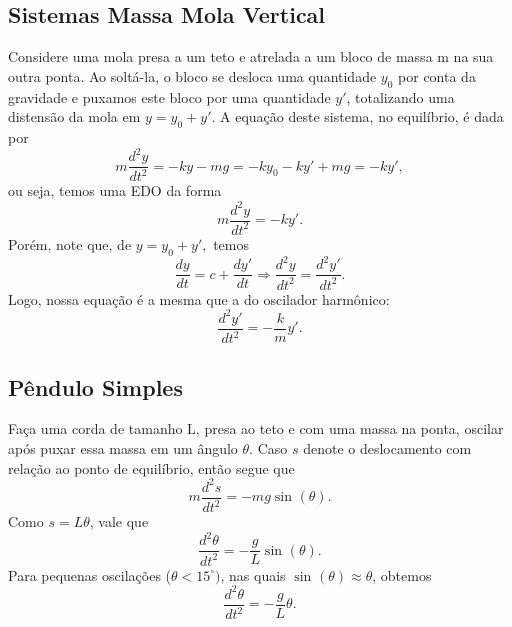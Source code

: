 \documentclass[PhysicsII/physicsII_notes.tex]{subfiles}
\begin{document}
\subsection{Sistemas Massa Mola Vertical}

Considere uma mola presa a um teto e atrelada a um bloco de massa m na sua outra ponta. Ao soltá-la, o bloco
se desloca uma quantidade \(y_{0}\) por conta da gravidade e puxamos este bloco por uma quantidade \(y'\), totalizando
uma distensão da mola em \(y = y_{0}+y'.\) A equação deste sistema, no equilíbrio, é dada por
\[
	m \frac{d^{2}y}{dt^{2}} = -ky - mg = -ky_{0}-ky'+mg = - ky',
\]
ou seja, temos uma EDO da forma
\[
	m \frac{d^{2}y}{dt^{2}} = -ky'.
\]
Porém, note que, de \(y=y_{0} + y',\) temos
\[
	\frac{dy}{dt} = c + \frac{dy'}{dt} \Rightarrow \frac{d^{2}y}{dt^{2}} = \frac{d^{2}y'}{dt^{2}}.
\]
Logo, nossa equação é a mesma que a do oscilador harmônico:
\[
	\frac{d^{2}y'}{dt^{2}} = -\frac{k}{m}y'.
\]
\subsection{Pêndulo Simples}
Faça uma corda de tamanho L, presa ao teto e com uma massa na ponta, oscilar após puxar essa massa em um ângulo \(\theta \).
Caso \(s\) denote o deslocamento com relação ao ponto de equilíbrio, então segue que
\[
	m \frac{d^{2}s}{dt^{2}} = -mg\sin^{}{(\theta )}.
\]
Como \(s = L\theta \), vale que
\[
	\frac{d^{2}\theta }{dt^{2}}=-\frac{g}{L}\sin^{}{(\theta )}.
\]
Para pequenas oscilações (\(\theta < 15^{\circ})\), nas quais \(\sin^{}{(\theta )}\approx \theta \), obtemos
\[
	\frac{d^{2}\theta }{dt^{2}} = -\frac{g}{L}\theta .
\]
\end{document}

